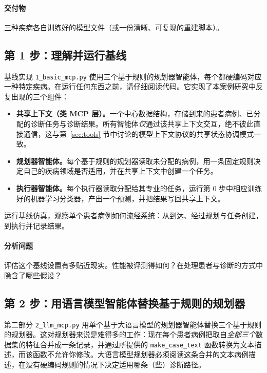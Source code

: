 \paragraph{交付物} 三种疾病各自训练好的模型文件（或一份清晰、可复现的重建脚本）。


\subsection{第 1 步：理解并运行基线}

基线实现 \texttt{1\_basic\_mcp.py} 使用三个基于规则的规划器智能体，每个都硬编码对应一种特定疾病。在运行任何东西之前，请仔细阅读代码。它实现了本案例研究中反复出现的三个组件：

\begin{itemize}
    \item \textbf{共享上下文（类 MCP 层）。}一个中心数据结构，存储到来的患者病例、已分配的诊断任务与诊断结果。所有智能体\emph{仅}通过该共享上下文交互，绝不彼此直接通信，这与第~\ref{sec:tools} 节中讨论的模型上下文协议的共享状态协调模式一致。
    \item \textbf{规划器智能体。}每个基于规则的规划器读取未分配的病例，用一条固定规则决定自己的疾病领域是否适用，并在共享上下文中创建一个任务。
    \item \textbf{执行器智能体。}每个执行器读取分配给其专业的任务，运行第 0 步中相应训练好的机器学习分类器，产出一个预测，并把结果写回共享上下文。
\end{itemize}

运行基线仿真，观察单个患者病例如何流经系统：从到达、经过规划与任务创建，到执行并记录结果。

\paragraph{分析问题} 评估这个基线设置有多贴近现实。性能被评测得如何？在处理患者与诊断的方式中隐含了哪些假设？



\subsection[第 2 步：替换基于规则的规划器]{第 2 步：用语言模型智能体替换基于规则的规划器}

第二部分 \texttt{2\_llm\_mcp.py} 用单个基于大语言模型的规划器智能体替换三个基于规则的规划器。这对规划器来说是难得多的工作：现在每个患者病例把取自\emph{全部三个}数据集的特征合并成一条记录，并通过所提供的 \texttt{make\_case\_text} 函数转换为文本描述，而该函数不允许你修改。大语言模型规划器必须阅读这条合并的文本病例描述，在没有硬编码规则的情况下决定适用哪条（些）诊断路径。

